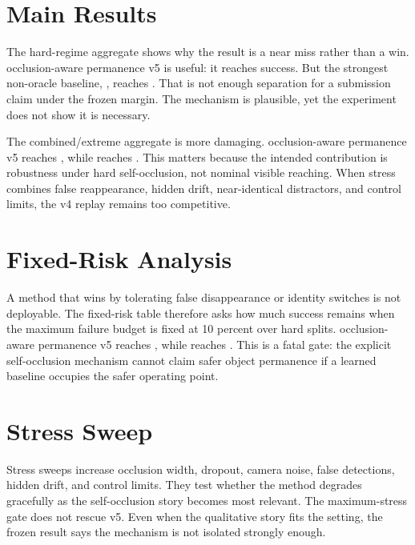 \documentclass{article}
\newcommand{\vfive}{occlusion-aware permanence v5}
\begin{document}
\section{Main Results}


The hard-regime aggregate shows why the result is a near miss rather than a win.
\vfive{} is useful: it reaches \VFiveHardSuccess{} success.
But the strongest non-oracle baseline, \BestHardMethod{}, reaches \BestHardSuccess{}.
That is not enough separation for a submission claim under the frozen margin.
The mechanism is plausible, yet the experiment does not show it is necessary.




The combined/extreme aggregate is more damaging.
\vfive{} reaches \VFiveCombinedSuccess{}, while \BestCombinedMethod{} reaches \BestCombinedSuccess{}.
This matters because the intended contribution is robustness under hard self-occlusion, not nominal visible reaching.
When stress combines false reappearance, hidden drift, near-identical distractors, and control limits, the v4 replay remains too competitive.

\section{Fixed-Risk Analysis}


A method that wins by tolerating false disappearance or identity switches is not deployable.
The fixed-risk table therefore asks how much success remains when the maximum failure budget is fixed at 10 percent over hard splits.
\vfive{} reaches \VFiveFixedRiskSuccess{}, while \BestFixedRiskMethod{} reaches \BestFixedRiskSuccess{}.
This is a fatal gate: the explicit self-occlusion mechanism cannot claim safer object permanence if a learned baseline occupies the safer operating point.

\section{Stress Sweep}


Stress sweeps increase occlusion width, dropout, camera noise, false detections, hidden drift, and control limits.
They test whether the method degrades gracefully as the self-occlusion story becomes most relevant.
The maximum-stress gate does not rescue v5.
Even when the qualitative story fits the setting, the frozen result says the mechanism is not isolated strongly enough.
\end{document}

